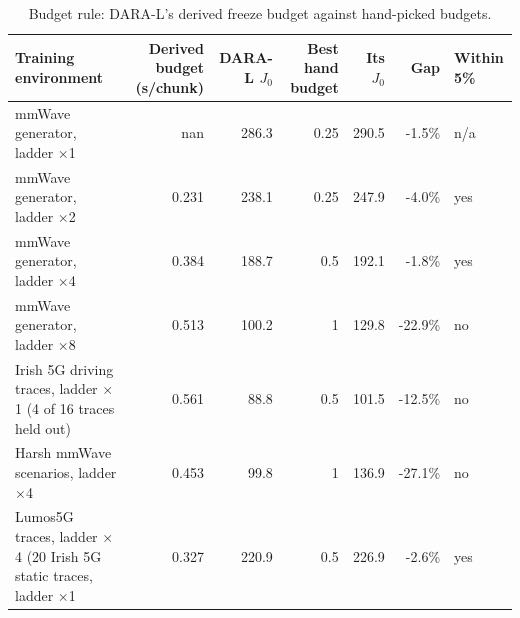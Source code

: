 \begin{table}[t]\centering\footnotesize
\caption{Budget rule: DARA-L's derived freeze budget against hand-picked budgets.}
\label{tab:budget}
\begin{tabular}{lrrrrrl}\toprule
Training environment & Derived budget (s/chunk) & DARA-L $J_0$ & Best hand budget & Its $J_0$ & Gap & Within 5\% \\\midrule
mmWave generator, ladder $\times$1 & nan & 286.3 & 0.25 & 290.5 & -1.5\% & n/a \\
mmWave generator, ladder $\times$2 & 0.231 & 238.1 & 0.25 & 247.9 & -4.0\% & yes \\
mmWave generator, ladder $\times$4 & 0.384 & 188.7 & 0.5 & 192.1 & -1.8\% & yes \\
mmWave generator, ladder $\times$8 & 0.513 & 100.2 & 1 & 129.8 & -22.9\% & no \\
Irish 5G driving traces, ladder $\times$1 (4 of 16 traces held out) & 0.561 & 88.8 & 0.5 & 101.5 & -12.5\% & no \\
Harsh mmWave scenarios, ladder $\times$4 & 0.453 & 99.8 & 1 & 136.9 & -27.1\% & no \\
Lumos5G traces, ladder $\times$4 (20%
Irish 5G static traces, ladder $\times$1 & 0.327 & 220.9 & 0.5 & 226.9 & -2.6\% & yes \\
\bottomrule\end{tabular}
\end{table}
